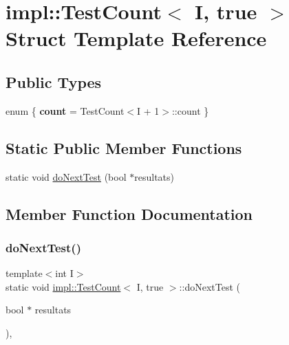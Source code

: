 \hypertarget{structimpl_1_1TestCount_3_01I_00_01true_01_4}{}\section{impl\+:\+:Test\+Count$<$ I, true $>$ Struct Template Reference}
\label{structimpl_1_1TestCount_3_01I_00_01true_01_4}
\subsection*{Public Types}
\begin{DoxyCompactItemize}
\item 
\mbox{\label{structimpl_1_1TestCount_3_01I_00_01true_01_4_a74bc23e9df8e6408a4609f77e1ae79f8}} 
enum \{ {\bfseries count} = Test\+Count$<$I + 1$>$\+:\+:count
 \}
\end{DoxyCompactItemize}
\subsection*{Static Public Member Functions}
\begin{DoxyCompactItemize}
\item 
static void \hyperlink{structimpl_1_1TestCount_3_01I_00_01true_01_4_a49739cfdb5be878f725d73b2ef4743ef}{do\+Next\+Test} (bool $\ast$resultats)
\end{DoxyCompactItemize}


\subsection{Member Function Documentation}
\mbox{\label{structimpl_1_1TestCount_3_01I_00_01true_01_4_a49739cfdb5be878f725d73b2ef4743ef}} 
\subsubsection{\texorpdfstring{do\+Next\+Test()}{doNextTest()}}
{\footnotesize\ttfamily template$<$int I$>$ \\
static void \hyperlink{structimpl_1_1TestCount}{impl\+::\+Test\+Count}$<$ I, true $>$\+::do\+Next\+Test (\begin{DoxyParamCaption}\item[{bool $\ast$}]{resultats }\end{DoxyParamCaption})\hspace{0.3cm}{\ttfamily [inline]}, {\ttfamily [static]}}

